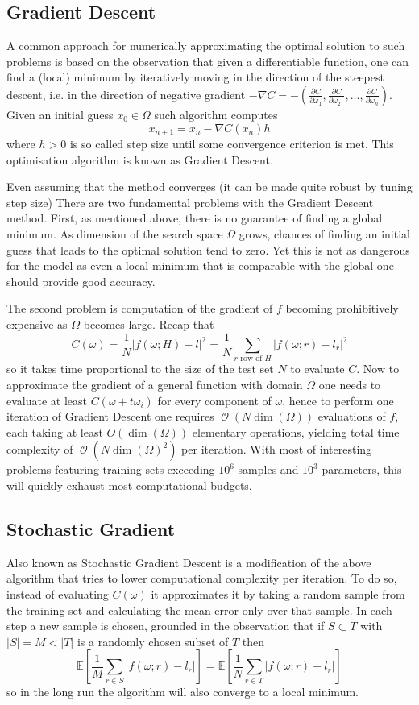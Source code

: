 \documentclass[a4paper]{article}
\theoremstyle{break}
\newcommand{\Exp}{\mathbb{E}}
\DeclareMathOperator{\bO}{\mathcal{O}}
\begin{document}
\subsection{Gradient Descent}
A common approach for numerically approximating the optimal solution to such problems is based on the observation that given a differentiable function, one can find a (local) minimum by iteratively moving in the direction of the steepest descent, i.e. in the direction of negative gradient $ - \nabla C  = - ( \frac{\partial C}{\partial \omega_1}, \frac{\partial C}{\partial \omega_2, }, ..., \frac{\partial C}{\partial \omega_n})$. Given an initial guess $x_0 \in \Omega$ such algorithm computes
    $$ x_{n+1} = x_{n} - \nabla C (x_n) h $$
where $h > 0$ is so called step size until some convergence criterion is met. This optimisation algorithm is known as Gradient Descent.

Even assuming that the method converges (it can be made quite robust by tuning step size) There are two fundamental problems with the Gradient Descent method. First, as mentioned above, there is no guarantee of finding a global minimum. As dimension of the search space $ \Omega $ grows, chances of finding an initial guess that leads to the optimal solution tend to zero. Yet this is not as dangerous for the model as even a local minimum that is comparable with the global one should provide good accuracy.

The second problem is computation of the gradient of $f$ becoming prohibitively expensive as $ \Omega $ becomes large. Recap that
    $$ C(\omega) =  \frac{1}{N} | f(\omega; H) - l |^2 =
       \frac{1}{N} \sum_{r \text{ row of } H} | f(\omega; r) - l_r |^2 $$
so it takes time proportional to the size of the test set $N$ to evaluate $C$.
Now to approximate the gradient of a general function with domain $ \Omega $ one needs to evaluate at least $C(\omega + t \omega_i)$ for every component of $ \omega $, hence to perform one iteration of Gradient Descent one requires $ \bO( N  \dim(\Omega) ) $ evaluations of $f$,
each taking at least $ O( \dim(\Omega))$ elementary operations, yielding total time complexity of $ \bO( N \dim(\Omega)^2)$ per iteration. With most of interesting problems featuring training sets exceeding $ 10^6 $ samples and $ 10^3 $ parameters, this will quickly exhaust most computational budgets.

\subsection{Stochastic Gradient}
Also known as Stochastic Gradient Descent is a modification of the above algorithm that tries to lower computational complexity per iteration. To do so, instead of evaluating $C(\omega)$ it approximates it by taking a random sample from the training set and calculating the mean error only over that sample. In each step a new sample is chosen, grounded in the observation that if $ S \subset T $ with $ | S | = M < |T| $ is a randomly chosen subset of $T$ then
    $$ \Exp \left[ \frac{1}{M} \sum_{r \in S} | f(\omega; r) - l_r | \right] =
       \Exp \left[ \frac{1}{N} \sum_{r \in T} | f(\omega; r) - l_r | \right] $$
so in the long run the algorithm will also converge to a local minimum.
\end{document}
